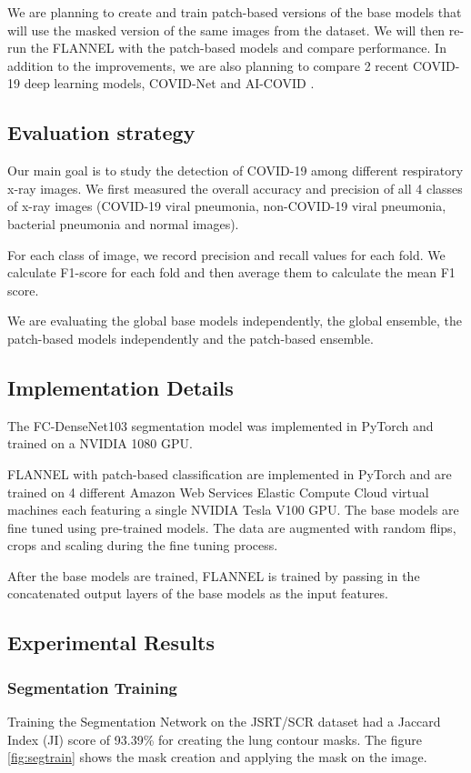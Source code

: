 \documentclass{sigkddExp}
\begin{document}
We are planning to create and train patch-based versions of the base models
that will use the masked version of the same images from the dataset. We will
then re-run the FLANNEL with the patch-based models and compare performance.
In addition to the improvements, we are  also planning to compare 2 recent
COVID-19 deep learning models, COVID-Net \cite{wang2020covidnet} and AI-COVID
\cite{pmid32339081}.


\subsection{Evaluation strategy}
Our main goal is to study the detection of COVID-19 among different respiratory
x-ray images. We first measured the overall accuracy and precision of all 4
classes of x-ray images (COVID-19 viral pneumonia, non-COVID-19 viral pneumonia,
bacterial pneumonia and normal images).

For each class of image, we record precision and recall values for each fold.
We calculate F1-score for each fold and then average them to calculate the mean
F1 score.

We are evaluating the global base models independently, the global ensemble,
the patch-based models independently and the patch-based ensemble.

\subsection{Implementation Details}
The FC-DenseNet103 segmentation model was implemented in PyTorch and trained on
a NVIDIA 1080 GPU.

FLANNEL with patch-based classification are implemented in PyTorch and are
trained on 4 different Amazon Web Services Elastic Compute Cloud virtual
machines each featuring a single NVIDIA Tesla V100 GPU. The base models
are fine tuned using pre-trained models. The data are
augmented with random flips, crops and scaling during the fine tuning process.

After the base models are trained, FLANNEL is trained by passing in the
concatenated output layers of the base models as the input features.

\subsection{Experimental Results}
\subsubsection{Segmentation Training}
Training the Segmentation Network on the JSRT/SCR dataset had a Jaccard Index
(JI) score of 93.39\% for creating the lung contour masks. The figure \ref{fig:segtrain}
shows the mask creation and applying the mask on the image.
\end{document}
